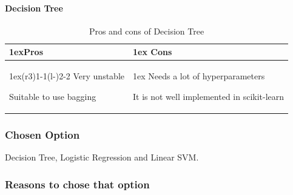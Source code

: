 \documentclass{article}
\begin{document}
        \paragraph{Decision Tree}
        \begin{table}
        \begin{tabularx}{\linewidth}{>{\parskip1ex}X@{\kern4\tabcolsep}>{\parskip1ex}X}
        \toprule
        \hfil\bfseries Pros
        &
        \hfil\bfseries Cons
        \\\cmidrule(r{3\tabcolsep}){1-1}\cmidrule(l{-\tabcolsep}){2-2}
        Very unstable\par
        Suitable to use bagging\par
        &
        Needs a lot of hyperparameters\par
        It is not well implemented in scikit-learn\par
        \\\bottomrule
        \end{tabularx}
        \caption{Pros and cons of Decision Tree}
        \end{table}

        \subsubsection{Chosen Option}
        Decision Tree, Logistic Regression and Linear SVM.
        \subsubsection{Reasons to chose that option}
\end{document}
